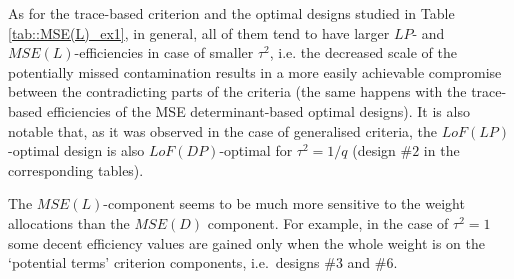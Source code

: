 As for the trace-based criterion and the optimal designs studied in Table \ref{tab::MSE(L)_ex1}, in general, all of them tend to have larger $LP$- and $MSE(L)$-efficiencies in case of smaller $\tau^2$, i.e. the decreased scale of the potentially missed contamination results in a more easily achievable compromise between the contradicting parts of the criteria (the same happens with the trace-based efficiencies of the MSE determinant-based optimal designs). It is also notable that, as it was observed in the case of generalised criteria, the $LoF(LP)$-optimal design is also $LoF(DP)$-optimal for $\tau^2=1/q$ (design \#$2$ in the corresponding tables).

The $MSE(L)$-component seems to be much more sensitive to the weight allocations than the $MSE(D)$ component. For example, in the case of $\tau^2=1$ some decent efficiency values are gained only when the whole weight is on the `potential terms' criterion components, i.e.~designs \#$3$ and \#$6$. 

